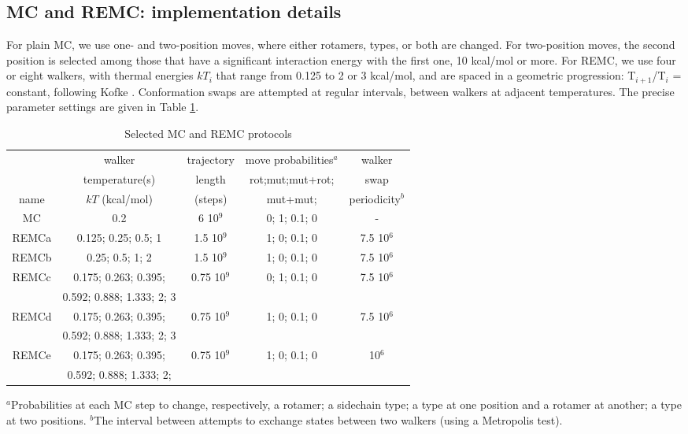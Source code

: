 \subsection{MC and REMC: implementation details}
\label{sub:REMCdetails}
For plain MC, we use one- and two-position moves, where either rotamers, types, or both are changed. For two-position
moves, the second position is selected among those that have a significant interaction energy with the first
one, 10 kcal/mol or more. For REMC, we use four or eight walkers, with thermal energies $kT_i$ that range from 0.125
to 2 or 3 kcal/mol, and are spaced in a geometric progression: T$_{i+1}$/T$_i$ = constant, following Kofke \cite{Kofke02}.
Conformation swaps are attempted at regular intervals, between walkers at adjacent temperatures. The precise parameter
settings are given in Table \ref{tab:parameters}.

\begin{table}[H]                            
\caption{Selected MC and REMC protocols}
\label{tab:parameters}                      
\begin{center} \small 
\renewcommand{\arraystretch}{0.75}
\begin{tabular}{ccccc} \hline \hline  
      &  walker                   & trajectory & move probabilities$^a$ & walker     \\ 
      &  temperature(s)           & length     & rot;mut;mut+rot; & swap       \\ 
name  & $kT$ (kcal/mol)           & (steps)    & mut+mut;         & periodicity$^b$ \smallskip \\  \hline 
MC    & 0.2                       &   6 10$^9$ & 0; 1; 0.1; 0     &  -          \smallskip \\      
REMCa & 0.125; 0.25; 0.5; 1       & 1.5 10$^9$ & 1; 0; 0.1; 0     & 7.5 10$^6$  \smallskip \\   
REMCb & 0.25; 0.5; 1; 2           & 1.5 10$^9$ & 1; 0; 0.1; 0     & 7.5 10$^6$  \smallskip \\ 
REMCc & 0.175; 0.263; 0.395;      & 0.75 10$^9$& 0; 1; 0.1; 0     & 7.5 10$^6$  \\
      & 0.592; 0.888; 1.333; 2; 3 &  &  &  \smallskip \\
REMCd & 0.175; 0.263; 0.395;      &0.75 10$^9$ & 1; 0; 0.1; 0     & 7.5 10$^6$  \\
      & 0.592; 0.888; 1.333; 2; 3 &  &  &  \smallskip \\
REMCe & 0.175; 0.263; 0.395;      &0.75 10$^9$ & 1; 0; 0.1; 0     &     10$^6$  \\ 
      & 0.592; 0.888; 1.333; 2;   &  &  &  \smallskip \\ \hline
\end{tabular}
\end{center}
{\small \noindent $^a$Probabilities at each MC step to change, respectively, a
rotamer; a sidechain type; a type at one position and a rotamer at another;
a type at two positions. $^b$The interval between attempts to exchange states
between two walkers (using a Metropolis test).
}
\end{table}








